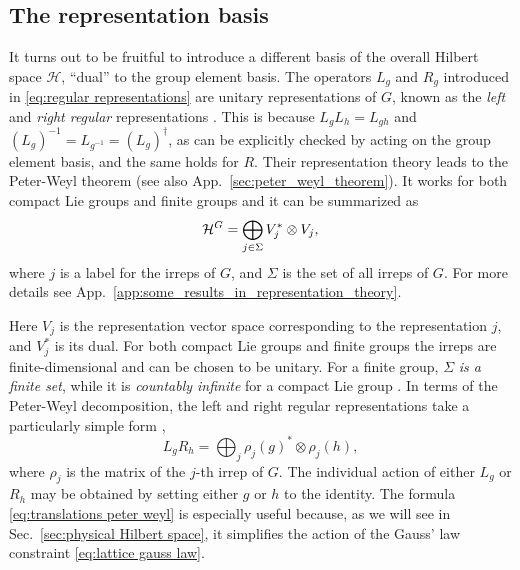 \subsection{The representation basis}%
\label{sub:the_representation_basis}

It turns out to be fruitful to introduce a different basis of the overall Hilbert space $\mathcal{H}$, ``dual'' to the group element basis.
The operators $L_g$ and $R_g$ introduced in \eqref{eq:regular representations} are unitary representations of $G$, known as the \textit{left} and \textit{right regular} representations \cite{serre1967representations, knapp1996lie}.
This is because $L_g L_h = L_{gh}$ and $(L_g)^{-1}=L_{g^{-1}}=(L_g)^\dagger$, as can be explicitly checked by acting on the group element basis, and the same holds for $R$.
Their representation theory leads to the Peter-Weyl theorem \cite{knapp1996lie, milstead2018qyangmills} (see also App.~\ref{sec:peter_weyl_theorem}).
It works for both compact Lie groups and finite groups and it can be summarized as
\begin{equation}
    \label{eq:peterweyl}
    \mathcal{H}^{G} = \bigoplus_{j \in \Sigma} V_j^* \otimes V_j,
\end{equation}
where $j$ is a label for the \acp{irrep} of $G$, and $\Sigma$ is the set of all \acp{irrep} of $G$.
For more details see App.~\ref{app:some_results_in_representation_theory}.

Here $V_j$ is the representation vector space corresponding to the representation $j$, and $V_j^{\ast}$ is its dual.
For both compact Lie groups and finite groups the \acp{irrep} are finite-dimensional and can be chosen to be unitary.
For a finite group, $\Sigma$ \emph{is a finite set}, while it is \emph{countably infinite} for a compact Lie group \cite{knapp1996lie, serre1967representations}.
In terms of the Peter-Weyl decomposition, the left and right regular representations take a particularly simple form \cite{marianithesis},
\begin{equation}
    L_g R_h = \bigoplus_j \rho_j(g)^* \otimes \rho_j(h),
    \label{eq:translations peter weyl}
\end{equation}
where $\rho_j$ is the matrix of the $j$-th \ac{irrep} of $G$.
The individual action of either $L_g$ or $R_h$ may be obtained by setting either $g$ or $h$ to the identity.
The formula \eqref{eq:translations peter weyl} is especially useful because, as we will see in Sec.~\ref{sec:physical Hilbert space}, it simplifies the action of the Gauss' law constraint \eqref{eq:lattice gauss law}.

